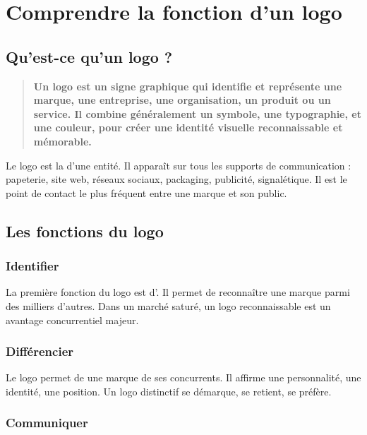 \section{Comprendre la fonction d'un logo}

\subsection{Qu'est-ce qu'un logo ?}

\begin{quote}
\textbf{Un logo est un signe graphique qui identifie et représente une marque, une entreprise, une organisation, un produit ou un service. Il combine généralement un symbole, une typographie, et une couleur, pour créer une identité visuelle reconnaissable et mémorable.}
\end{quote}

Le logo est la  d'une entité. Il apparaît sur tous les supports de communication : papeterie, site web, réseaux sociaux, packaging, publicité, signalétique. Il est le point de contact le plus fréquent entre une marque et son public.

\subsection{Les fonctions du logo}

\subsubsection{Identifier}

La première fonction du logo est d'. Il permet de reconnaître une marque parmi des milliers d'autres. Dans un marché saturé, un logo reconnaissable est un avantage concurrentiel majeur.

\subsubsection{Différencier}

Le logo permet de  une marque de ses concurrents. Il affirme une personnalité, une identité, une position. Un logo distinctif se démarque, se retient, se préfère.

\subsubsection{Communiquer}

